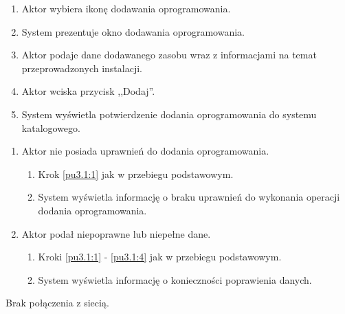 \begin{enumerate}
\item \label{pu3.1:1} Aktor wybiera ikonę dodawania oprogramowania.
\item System prezentuje okno dodawania oprogramowania.
\item Aktor podaje dane dodawanego zasobu wraz z informacjami na temat przeprowadzonych instalacji.
\item \label{pu3.1:4} Aktor wciska przycisk ,,Dodaj''.
\item System wyświetla potwierdzenie dodania oprogramowania do systemu katalogowego.
\end{enumerate}

\begin{enumerate}
\item Aktor nie posiada uprawnień do dodania oprogramowania.
	\begin{enumerate}[label*=\arabic*.]
		\item Krok \ref{pu3.1:1} jak w przebiegu podstawowym.
		\item System wyświetla informację o braku uprawnień do wykonania operacji dodania oprogramowania.
	\end{enumerate}
\item Aktor podał niepoprawne lub niepełne dane.
	\begin{enumerate}[label*=\arabic*.]
		\item Kroki \ref{pu3.1:1} - \ref{pu3.1:4} jak w przebiegu podstawowym.
		\item System wyświetla informację o konieczności poprawienia danych.
	\end{enumerate}
\end{enumerate}

Brak połączenia z siecią.

